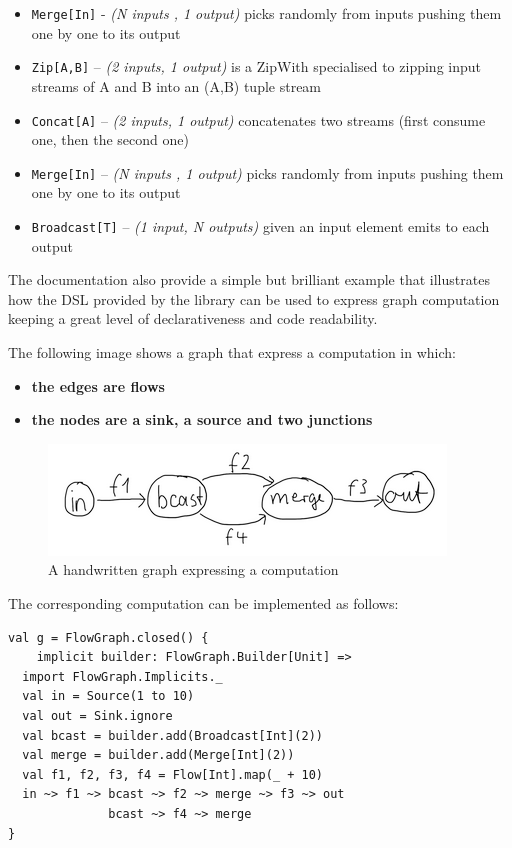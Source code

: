 \begin{itemize}
\itemsep1pt\parskip0pt
\item
  \texttt{Merge{[}In{]}} - \emph{(N inputs , 1 output)} picks randomly
  from inputs pushing them one by one to its output
\item
  \texttt{Zip{[}A,B{]}} -- \emph{(2 inputs, 1 output)} is a ZipWith
  specialised to zipping input streams of A and B into an (A,B) tuple
  stream
\item
  \texttt{Concat{[}A{]}} -- \emph{(2 inputs, 1 output)} concatenates two
  streams (first consume one, then the second one)
\item
  \texttt{Merge{[}In{]}} -- \emph{(N inputs , 1 output)} picks randomly
  from inputs pushing them one by one to its output
\item
  \texttt{Broadcast{[}T{]}} -- \emph{(1 input, N outputs)} given an
  input element emits to each output
\end{itemize}

The documentation also provide a simple but brilliant example that
illustrates how the DSL provided by the library can be used to express
graph computation keeping a great level of declarativeness and code
readability.

The following image shows a graph that express a computation in which:

\begin{itemize}
\itemsep1pt\parskip0pt
\item
  \textbf{the edges are flows}
\item
  \textbf{the nodes are a sink, a source and two junctions}
\end{itemize}

\begin{figure}[htbp]
\centering
\includegraphics[scale=0.75]{imgs/graph.png}
\caption{A handwritten graph expressing a computation}
\end{figure}

The corresponding computation can be implemented as follows:

\begin{verbatim}
val g = FlowGraph.closed() { 
	implicit builder: FlowGraph.Builder[Unit] =>
  import FlowGraph.Implicits._
  val in = Source(1 to 10)
  val out = Sink.ignore
  val bcast = builder.add(Broadcast[Int](2))
  val merge = builder.add(Merge[Int](2))
  val f1, f2, f3, f4 = Flow[Int].map(_ + 10)
  in ~> f1 ~> bcast ~> f2 ~> merge ~> f3 ~> out
              bcast ~> f4 ~> merge
}
\end{verbatim}


